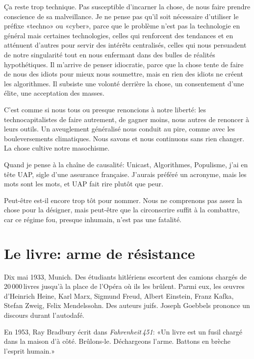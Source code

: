 \documentclass[a5paper, 10pt, twoside]{book}
\begin{document}
Ça reste trop technique. Pas susceptible d’incarner la chose, de nous
faire prendre conscience de sa malveillance. Je ne pense pas qu’il soit
nécessaire d’utiliser le préfixe «techno» ou «cyber», parce que le
problème n’est pas la technologie en général mais certaines
technologies, celles qui renforcent des tendances et en atténuent
d’autres pour servir des intérêts centralisés, celles qui nous
persuadent de notre singularité tout en nous enfermant dans des bulles
de réalités hypothétiques. Il m’arrive de penser idiocratie, parce que
la chose tente de faire de nous des idiots pour mieux nous soumettre,
mais en rien des idiots ne créent les algorithmes. Il subsiste une
volonté derrière la chose, un consentement d’une élite, une acceptation
des masses.

C’est comme si nous tous ou presque renoncions à notre liberté: les
technocapitalistes de faire autrement, de gagner moins, nous autres de
renoncer à leurs outils. Un aveuglement généralisé nous conduit au pire,
comme avec les bouleversements climatiques. Nous savons et nous
continuons sans rien changer. La chose cultive notre masochisme.

Quand je pense à la chaîne de causalité: Unicast, Algorithmes,
Populisme, j’ai en tête UAP, sigle d’une assurance française. J’aurais
préféré un acronyme, mais les mots sont les mots, et UAP fait rire
plutôt que peur.

Peut-être est-il encore trop tôt pour nommer. Nous ne comprenons pas
assez la chose pour la désigner, mais peut-être que la circonscrire
suffit à la combattre, car ce régime fou, presque inhumain, n’est pas
une fatalité.

\chapter{\texorpdfstring{Le livre: arme de
résistance}{    }}\label{le-livre-arme-de-ruxe9sistance}

Dix mai 1933, Munich. Des étudiants hitlériens escortent des camions
chargés de 20\,000\,livres jusqu’à la place de l’Opéra où ils les
brûlent. Parmi eux, les œuvres d’Heinrich Heine, Karl Marx, Sigmund
Freud, Albert Einstein, Franz Kafka, Stefan Zweig, Felix Mendelssohn.
Des auteurs juifs. Joseph Goebbels prononce un discours durant
l’autodafé.

En 1953, Ray Bradbury écrit dans \emph{Fahrenheit\,451}: «Un livre est
un fusil chargé dans la maison d’à côté. Brûlons-le. Déchargeons l’arme.
Battons en brèche l’esprit humain.»
\end{document}
